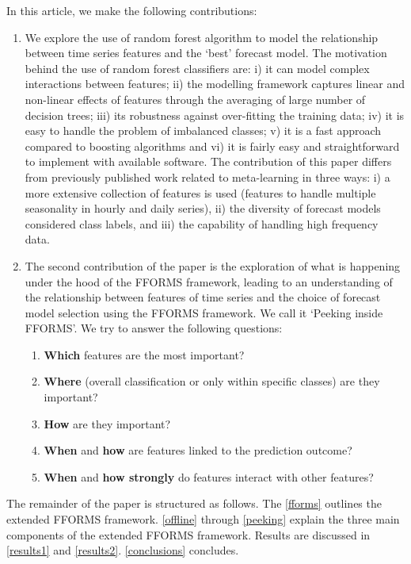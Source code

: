 \documentclass[11pt,a4paper,]{article}
\providecommand{\tightlist}{%
  \setlength{\itemsep}{0pt}\setlength{\parskip}{0pt}}
\begin{document}
In this article, we make the following contributions:

\begin{enumerate}
\def\labelenumi{\arabic{enumi}.}
\item
  We explore the use of random forest algorithm to model the relationship between time series features and the `best' forecast model. The motivation behind the use of random forest classifiers are: i) it can model complex interactions between features; ii) the modelling framework captures linear and non-linear effects of features through the averaging of large number of decision trees; iii) its robustness against over-fitting the training data; iv) it is easy to handle the problem of imbalanced classes; v) it is a fast approach compared to boosting algorithms and vi) it is fairly easy and straightforward to implement with available software. The contribution of this paper differs from previously published work related to meta-learning \autocites{prudencio2004meta}{lemke2010meta}{kuck2016meta} in three ways: i) a more extensive collection of features is used (features to handle multiple seasonality in hourly and daily series), ii) the diversity of forecast models considered class labels, and iii) the capability of handling high frequency data.
\item
  The second contribution of the paper is the exploration of what is happening under the hood of the FFORMS framework, leading to an understanding of the relationship between features of time series and the choice of forecast model selection using the FFORMS framework. We call it `Peeking inside FFORMS'. We try to answer the following questions:

  \begin{enumerate}
  \def\labelenumii{\roman{enumii})}
  \tightlist
  \item
    \textbf{Which} features are the most important?
  \item
    \textbf{Where} (overall classification or only within specific classes) are they important?
  \item
    \textbf{How} are they important?
  \item
    \textbf{When} and \textbf{how} are features linked to the prediction outcome?
  \item
    \textbf{When} and \textbf{how strongly} do features interact with other features?
  \end{enumerate}
\end{enumerate}

The remainder of the paper is structured as follows. The \autoref{fforms} outlines the extended FFORMS framework. \autoref{offline} through \autoref{peeking} explain the three main components of the extended FFORMS framework. Results are discussed in \autoref{results1} and \autoref{results2}. \autoref{conclusions} concludes.
\end{document}
